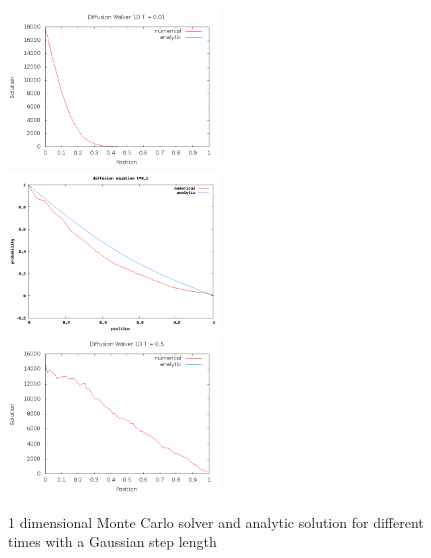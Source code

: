 \documentclass[a4wide,12pt]{article}
\begin{document}
\begin{figure}[p]
 \includegraphics[width=0.5\textwidth]{diff1dt001gauss}
 \includegraphics[width=0.5\textwidth]{diff01gauss}
 \includegraphics[width=0.5\textwidth]{diff1dt05gauss}
 \caption{1 dimensional Monte Carlo solver and analytic solution for different times with a Gaussian step length}
 \label{fig:03}
\end{figure}
 
\end{document}
